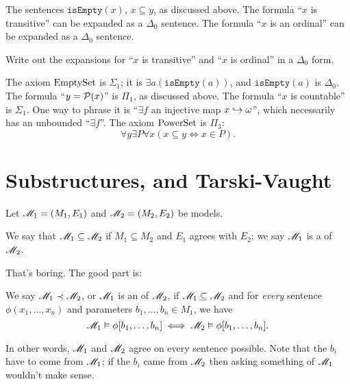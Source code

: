\begin{example}
	\listhack
	\begin{enumerate}[(a)]
		\ii The sentences $\mathtt{isEmpty}(x)$, $x \subseteq y$, as discussed above.
		\ii The formula ``$x$ is transitive'' can be expanded as a $\Delta_0$ sentence.
		\ii The formula ``$x$ is an ordinal'' can be expanded as a $\Delta_0$ sentence.
	\end{enumerate}
\end{example}
\begin{exercise}
	Write out the expansions for ``$x$ is transitive'' and ``$x$ is ordinal''
	in a $\Delta_0$ form.
\end{exercise}
\begin{example}
	\listhack
	\begin{enumerate}[(a)]
		\ii The axiom $\mathrm{EmptySet}$ is $\Sigma_1$; it is $\exists a (\mathtt{isEmpty}(a))$,
		and $\mathtt{isEmpty}(a)$ is $\Delta_0$.
		\ii The formula ``$y = \mathcal P(x)$'' is $\Pi_1$, as discussed above.
		\ii The formula ``$x$ is countable'' is $\Sigma_1$.
		One way to phrase it is ``$\exists f$ an injective map $x \hookrightarrow \omega$'',
		which necessarily has an unbounded ``$\exists f$''.
		\ii The axiom $\mathrm{PowerSet}$ is $\Pi_3$:
		\[ \forall y \exists P \forall x (x\subseteq y \iff x \in P). \]
	\end{enumerate}
\end{example}

\section{Substructures, and Tarski-Vaught}
Let $\mathscr M_1 = (M_1, E_1)$ and $\mathscr M_2 = (M_2, E_2)$ be models.
\begin{definition}
	We say that $\mathscr M_1 \subseteq \mathscr M_2$ if $M_1 \subseteq M_2$ and
	$E_1$ agrees with $E_2$; we say $\mathscr M_1$ is a  of $\mathscr M_2$.
\end{definition}

That's boring. The good part is:
\begin{definition}
	We say $\mathscr M_1 \prec \mathscr M_2$, or $\mathscr M_1$ is an  of $\mathscr M_2$,
	if $\mathscr M_1 \subseteq \mathscr M_2$ and for \emph{every} sentence $\phi(x_1, \dots, x_n)$
	and parameters $b_1, \dots, b_n \in M_1$, we have
	\[
		\mathscr M_1 \vDash \phi[b_1, \dots, b_n] \iff
		\mathscr M_2 \vDash \phi[b_1, \dots, b_n].
	\]
\end{definition}
In other words, $\mathscr M_1$ and $\mathscr M_2$ agree on every sentence possible.
Note that the $b_i$ have to come from $\mathscr M_1$; if the $b_i$ came from $\mathscr M_2$ then
asking something of $\mathscr M_1$ wouldn't make sense.

